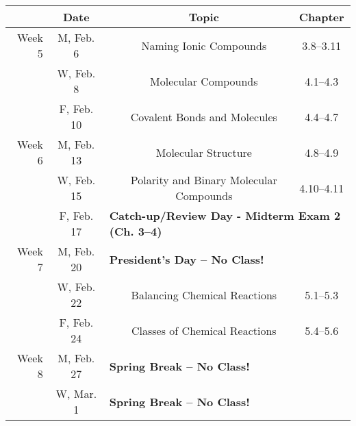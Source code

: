 \documentclass[12pt, letterpaper]{article}
\begin{document}
\noindent
\begin{tabular}{rcccc}
	            & Date       &                                                                                & Topic                                & Chapter      \\
	\midrule
	Week 5 & M, Feb. 6  &                                                                              & Naming Ionic Compounds                              & 3.8--3.11  \\
	       & W, Feb. 8  &                                                                              & Molecular Compounds                                 & 4.1--4.3   \\
	       & F, Feb. 10 &                                                                              & Covalent Bonds and Molecules                        & 4.4--4.7   \\
	\midrule
	Week 6 & M, Feb. 13 &                                                                              & Molecular Structure                                 & 4.8--4.9   \\
	       & W, Feb. 15 &                                                                              & Polarity and Binary Molecular Compounds             & 4.10--4.11 \\
	       & F, Feb. 17 & \multicolumn{3}{l}{\textbf{Catch-up/Review Day - Midterm Exam 2 (Ch. 3--4)}}                                                                    \\
	\midrule
	Week 7 & M, Feb. 20 & \multicolumn{3}{l}{\textbf{President's Day -- No Class!}}                                                                                       \\
	       & W, Feb. 22 &                                                                              & Balancing Chemical Reactions                        & 5.1--5.3   \\
	       & F, Feb. 24 &                                                                              & Classes of Chemical Reactions                       & 5.4--5.6   \\
	\midrule
	Week 8 & M, Feb. 27 & \multicolumn{3}{l}{\textbf{Spring Break -- No Class!}}                                                                                          \\
	       & W, Mar. 1  & \multicolumn{3}{l}{\textbf{Spring Break -- No Class!}}                                                                                          \\

\end{tabular}
\end{document}
